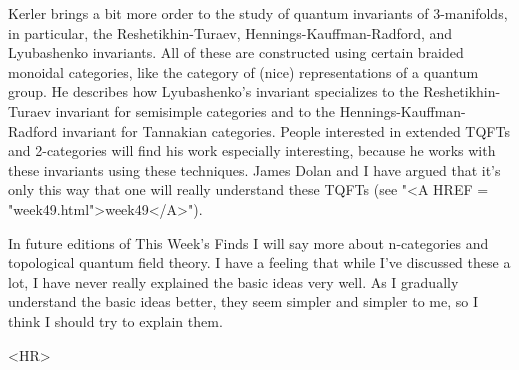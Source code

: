 Kerler brings a bit more order to the study of quantum
invariants of 3-manifolds, in particular, the Reshetikhin-Turaev,
Hennings-Kauffman-Radford, and Lyubashenko invariants.  All of these are
constructed using certain braided monoidal categories, like the category
of (nice) representations of a quantum group.  He describes how
Lyubashenko's invariant specializes to the Reshetikhin-Turaev invariant
for semisimple categories and to the Hennings-Kauffman-Radford invariant
for Tannakian categories.  People interested in extended TQFTs and
2-categories will find his work especially interesting, because he
works with these invariants using these techniques.  James Dolan and I
have argued that it's only this way that one will really understand
these TQFTs (see "<A HREF = "week49.html">week49</A>").  

In future editions of This Week's Finds I will say more about
n-categories and topological quantum field theory.  I have a feeling
that while I've discussed these a lot, I have never really explained the
basic ideas very well.  As I gradually understand the basic ideas
better, they seem simpler and simpler to me, so I think I should try to
explain them.




<HR>



